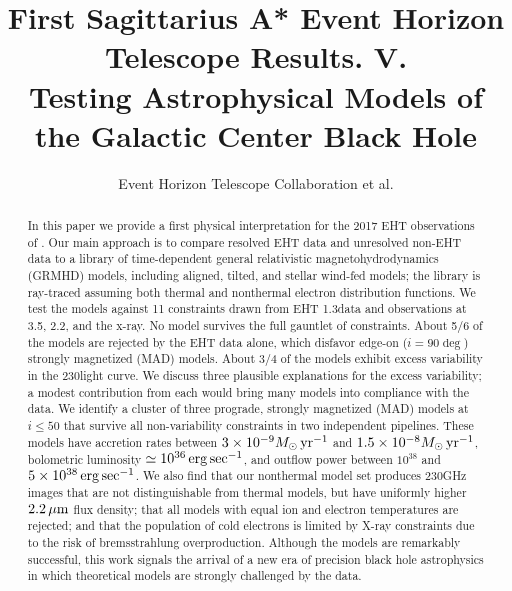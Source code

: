 \documentclass[twocolumn,twocolappendix,tighten,dvipsnames,linenumbers]{aastex63}
\begin{document}
\title{First Sagittarius A* Event Horizon Telescope Results. V.\\
  Testing Astrophysical Models of the Galactic Center Black Hole}

%
\author{Event Horizon Telescope Collaboration et al.}


\received{\today}
\revised{\today}

\begin{abstract}

  In this paper we provide a first physical interpretation for the
  2017 EHT observations of \sgra.
  Our main approach is to compare resolved EHT data and unresolved
  non-EHT data to a library of time-dependent general relativistic
  magnetohydrodynamics (GRMHD) models, including aligned, tilted, and
  stellar wind-fed models; the library is ray-traced assuming both
  thermal and nonthermal electron distribution functions.
  We test the models against 11 constraints drawn from EHT
  1.3\mm data and observations at 3.5\mm, 2.2\um, and the x-ray.
  No model survives the full gauntlet of constraints. About 5/6 of the models are rejected by the EHT data alone, which disfavor edge-on ($i = 90\deg$) strongly magnetized (MAD) models.  About 3/4 of the models exhibit excess variability in the 230\GHz light curve.  We discuss three plausible explanations for the excess variability; a modest contribution from each would bring many models into compliance with the data.  We identify a cluster of three prograde, strongly magnetized (MAD) models at $i \le 50$ that survive all non-variability constraints in two independent pipelines.  These models have accretion rates between $3\times 10^{-9} M_\odot \,\mathrm{yr}^{-1}$ and $1.5 \times 10^{-8} M_\odot\,\mathrm{yr}^{-1}$, bolometric luminosity $\simeq 10^{36} \,\mathrm{erg} \,\mathrm{sec}^{-1}$, and outflow power between $10^{38}$ and $5 \times 10^{38} \,\mathrm{erg} \,\mathrm{sec}^{-1}$.  We also find that our nonthermal model set produces 230GHz images that are not distinguishable from  thermal models, but have uniformly higher $2.2\,\mu\mathrm{m}$ flux density; that all models with equal ion and electron temperatures are rejected; and that the population of cold electrons is limited by X-ray constraints due to the risk of bremsstrahlung overproduction.  
  Although the models are remarkably successful, this work signals the
  arrival of a new era of precision black hole astrophysics in which
  theoretical models are strongly challenged by the data.
\end{abstract}
\end{document}
